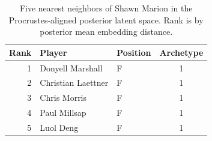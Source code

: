 \begin{table}[htbp]
  \centering\small
  \begin{tabular}{rllc}
    \toprule
    Rank & Player & Position & Archetype \\
    \midrule
    1 & Donyell Marshall & F & 1 \\
    2 & Christian Laettner & F & 1 \\
    3 & Chris Morris & F & 1 \\
    4 & Paul Millsap & F & 1 \\
    5 & Luol Deng & F & 1 \\
    \bottomrule
  \end{tabular}
  \caption{Five nearest neighbors of Shawn Marion in the Procrustes-aligned posterior latent space. Rank is by posterior mean embedding distance.}
  \label{tab:Shawn_Marion_neighbors}
\end{table}

